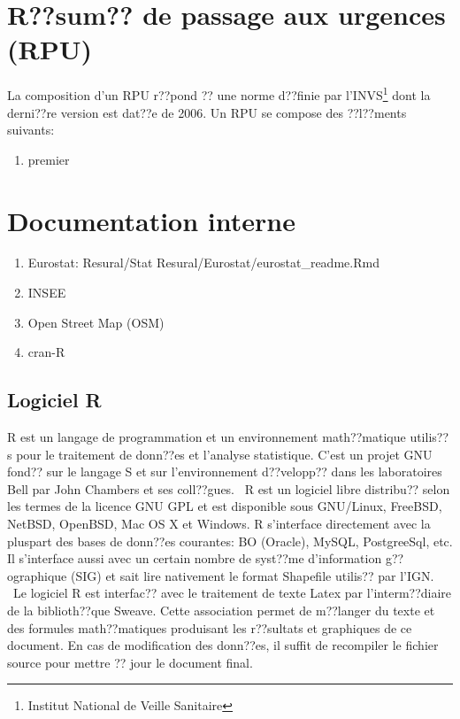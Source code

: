 
\chapter{R??sum?? de passage aux urgences (RPU)}
La composition d'un RPU r??pond ?? une norme d??finie par l'INVS\footnote{Institut National de Veille Sanitaire} dont la derni??re version est dat??e de 2006. Un RPU se compose des ??l??ments suivants:
\begin{enumerate}
  \item premier
\end{enumerate}

\chapter{Documentation interne}
\begin{enumerate}
  \item Eurostat: Resural\//Stat Resural\//Eurostat\//eurostat\_readme.Rmd
  \item INSEE
  \item Open Street Map (OSM)
  \item cran-R
\end{enumerate}

\section{Logiciel R}
R est un langage de programmation et un environnement math??matique utilis??s pour le traitement de donn??es et l'analyse statistique. C'est un projet GNU fond?? sur le langage S et sur l'environnement d??velopp?? dans les laboratoires Bell par John Chambers et ses coll??gues. 
\
R est un logiciel libre distribu?? selon les termes de la licence GNU GPL et est disponible sous GNU/Linux, FreeBSD, NetBSD, OpenBSD, Mac OS X et Windows. R s'interface directement avec la pluspart des bases de donn??es courantes: BO (Oracle), MySQL, PostgreeSql, etc. Il s'interface aussi avec un certain nombre de syst??me d'information g??ographique (SIG) et sait lire nativement le format Shapefile utilis?? par l'IGN.
\
Le logiciel R est interfac?? avec le traitement de texte Latex par l'interm??diaire de la biblioth??que Sweave. Cette association permet de m??langer du texte et des formules math??matiques produisant les r??sultats et graphiques de ce document. En cas de modification des donn??es, il suffit de recompiler le fichier source pour mettre ?? jour le document final.
\
